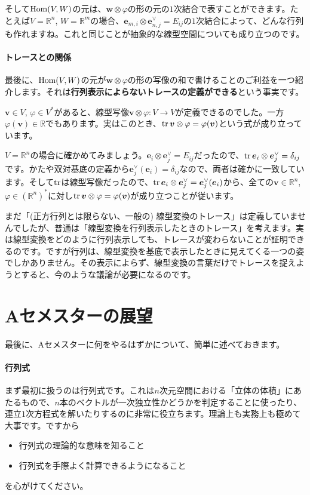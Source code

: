 そして$\operatorname{Hom}(V, W)$の元は、$\bm{w}\otimes\varphi$の形の元の$1$次結合で表すことができます。たとえば$V = \mathbb{R}^n$, $W = \mathbb{R}^m$の場合、$\bm{e}_{m, i}\otimes \bm{e}^{\vee}_{n, j} = E_{ij}$の$1$次結合によって、どんな行列も作れますね。これと同じことが抽象的な線型空間についても成り立つのです。

\paragraph{トレースとの関係} 最後に、$\operatorname{Hom}(V, W)$の元が$\bm{w}\otimes\varphi$の形の写像の和で書けることのご利益を一つ紹介します。それは\textbf{行列表示によらないトレースの定義ができる}という事実です。

$\bm{v} \in V$, $\varphi \in V^*$があると、線型写像$\bm{v} \otimes \varphi \colon V \rightarrow V$が定義できるのでした。一方$\varphi(\bm{v}) \in \mathbb{R}$でもあります。実はこのとき、$\operatorname{tr} \boldsymbol{v} \otimes \varphi = \varphi(\boldsymbol{v})$という式が成り立っています。

$V = \mathbb{R}^n$の場合に確かめてみましょう。$\bm{e}_i \otimes \bm{e}^{\vee}_j = E_{ij}$だったので、$\operatorname{tr} \boldsymbol{e}_i \otimes \boldsymbol{e}^{\vee}_j = \delta_{ij}$です。かたや双対基底の定義から$\bm{e}^{\vee}_j(\bm{e}_i) = \delta_{ij}$なので、両者は確かに一致しています。そして$\operatorname{tr}$は線型写像だったので、$\operatorname{tr} \boldsymbol{e}_i \otimes \boldsymbol{e}^{\vee}_j = \boldsymbol{e}^{\vee}_j(\boldsymbol{e}_i)$から、全ての$\bm{v} \in \mathbb{R}^n$, $\varphi \in (\mathbb{R}^n)^*$に対し$\operatorname{tr} \boldsymbol{v} \otimes \varphi = \varphi(\boldsymbol{v})$が成り立つことが従います。

まだ「(正方行列とは限らない、一般の) 線型変換のトレース」は定義していませんでしたが、普通は「線型変換を行列表示したときのトレース」を考えます。実は線型変換をどのように行列表示しても、トレースが変わらないことが証明できるのです。ですが行列は、線型変換を基底で表示したときに見えてくる一つの姿でしかありません。その表示によらず、線型変換の言葉だけでトレースを捉えようとすると、今のような議論が必要になるのです。

\section{Aセメスターの展望}

最後に、Aセメスターに何をやるはずかについて、簡単に述べておきます。

\paragraph{行列式}

まず最初に扱うのは行列式です。これは$n$次元空間における「立体の体積」にあたるもので、$n$本のベクトルが一次独立性かどうかを判定することに使ったり、連立$1$次方程式を解いたりするのに非常に役立ちます。理論上も実務上も極めて大事です。ですから
\begin{itemize}
\item 行列式の理論的な意味を知ること
\item 行列式を手際よく計算できるようになること
\end{itemize}
を心がけてください。

